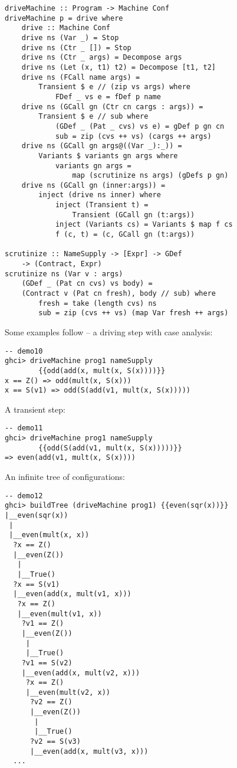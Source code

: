 \begin{lstlisting}[name=driving]
driveMachine :: Program -> Machine Conf
driveMachine p = drive where
	drive :: Machine Conf
	drive ns (Var _) = Stop
	drive ns (Ctr _ []) = Stop
	drive ns (Ctr _ args) = Decompose args
	drive ns (Let (x, t1) t2) = Decompose [t1, t2]
	drive ns (FCall name args) = 
		Transient $ e // (zip vs args) where
			FDef _ vs e = fDef p name
	drive ns (GCall gn (Ctr cn cargs : args)) = 
		Transient $ e // sub where
			(GDef _ (Pat _ cvs) vs e) = gDef p gn cn
			sub = zip (cvs ++ vs) (cargs ++ args)
	drive ns (GCall gn args@((Var _):_)) = 
		Variants $ variants gn args where
			variants gn args = 
				map (scrutinize ns args) (gDefs p gn)
	drive ns (GCall gn (inner:args)) = 
		inject (drive ns inner) where
			inject (Transient t) = 
				Transient (GCall gn (t:args))
			inject (Variants cs) = Variants $ map f cs
			f (c, t) = (c, GCall gn (t:args))

scrutinize :: NameSupply -> [Expr] -> GDef 
	-> (Contract, Expr)
scrutinize ns (Var v : args) 
	(GDef _ (Pat cn cvs) vs body) =
	(Contract v (Pat cn fresh), body // sub) where
		fresh = take (length cvs) ns
		sub = zip (cvs ++ vs) (map Var fresh ++ args)
\end{lstlisting}



Some examples follow -- a driving step with case analysis:
\begin{lstlisting}[style=demo]
-- demo10
ghci> driveMachine prog1 nameSupply 
        {{odd(add(x, mult(x, S(x))))}}
x == Z() => odd(mult(x, S(x)))
x == S(v1) => odd(S(add(v1, mult(x, S(x)))))
\end{lstlisting}

A transient step:
\begin{lstlisting}[style=demo]
-- demo11
ghci> driveMachine prog1 nameSupply 
	    {{odd(S(add(v1, mult(x, S(x)))))}}
=> even(add(v1, mult(x, S(x))))
\end{lstlisting}

An infinite tree of configurations:
\begin{lstlisting}[style=demo]
-- demo12
ghci> buildTree (driveMachine prog1) {{even(sqr(x))}}
|__even(sqr(x))
 |
 |__even(mult(x, x))
  ?x == Z()
  |__even(Z())
   |
   |__True()
  ?x == S(v1)
  |__even(add(x, mult(v1, x)))
   ?x == Z()
   |__even(mult(v1, x))
    ?v1 == Z()
    |__even(Z())
     |
     |__True()
    ?v1 == S(v2)
    |__even(add(x, mult(v2, x)))
     ?x == Z()
     |__even(mult(v2, x))
      ?v2 == Z()
      |__even(Z())
       |
       |__True()
      ?v2 == S(v3)
      |__even(add(x, mult(v3, x)))
  ...

\end{lstlisting}